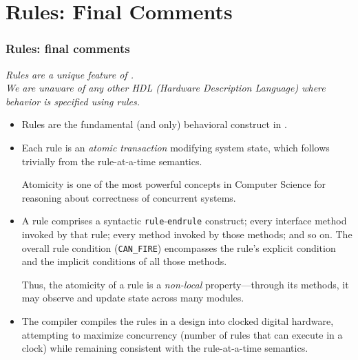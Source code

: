 
\section{Rules: Final Comments}

\begin{frame}[fragile]
\frametitle{Rules: final comments}

\footnotesize

 \emph{Rules are a unique feature of {\BSV}. \\
       We are unaware of any other HDL (Hardware Description Language)
       where behavior is specified using rules.}

\vspace{2ex}

\begin{itemize}
 \item Rules are the fundamental (and only) behavioral construct in {\BSV}.

 \vspace{2ex}

 \item Each rule is an \emph{atomic transaction} modifying system
       state, which follows trivially from the rule-at-a-time
       semantics.

       \vspace{1ex}

       Atomicity is one of the most powerful concepts in Computer
       Science for reasoning about correctness of concurrent systems.

 \vspace{2ex}

 \item A rule comprises a syntactic {\tt rule}-{\tt endrule}
       construct; every interface method invoked by that rule; every
       method invoked by those methods; and so on.  The overall rule
       condition ({\tt CAN\_FIRE}) encompasses the rule's explicit
       condition and the implicit conditions of all those methods.

       \vspace{1ex}

       Thus, the atomicity of a rule is a \emph{non-local}
       property---through its methods, it may observe and update state
       across many modules.

 \vspace{2ex}

 \item The {\bsc} compiler compiles the rules in a design into clocked
       digital hardware, attempting to maximize concurrency (number of
       rules that can execute in a clock) while remaining consistent
       with the rule-at-a-time semantics.

\end{itemize}

\end{frame}






